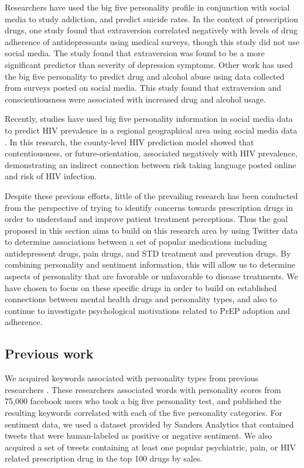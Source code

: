 Researchers have used the big five personality profile in conjunction with social media to study addiction\cite{andreassen2013relationships}, and predict suicide rates\cite{jashinsky2014tracking}. In the context of prescription drugs, one study found that extraversion correlated negatively with levels of drug adherence of antidepressants using medical surveys\cite{cohen20045}, though this study did not use social media. The study found that extraversion was found to be a more significant predictor than severity of depression symptoms. Other work has used the big five personality to predict drug and alcohol abuse\cite{livingston2015role} using data collected from surveys posted on social media. This study found that extraversion and conscientiousness were associated with increased drug and alcohol usage.

Recently, studies have used big five personality information in social media data to predict HIV prevalence in a regional geographical area using social media data \cite{ireland2015future}. In this research, the county-level HIV prediction model showed that contentiousness, or future-orientation, associated negatively with HIV prevalence, demonstrating an indirect connection between risk taking language posted online and risk of HIV infection.

Despite these previous efforts, little of the prevailing research has been conducted from the perspective of trying to identify concerns towards prescription drugs in order to understand and improve patient treatment perceptions. Thus the goal proposed in this section aims to build on this research area by using Twitter data to determine associations between a set of popular medications including antidepressent drugs, pain drugs, and STD treatment and prevention drugs. By combining personality and sentiment information, this will allow us to determine aspects of personality that are favorable or unfavorable to disease treatments. We have chosen to focus on these specific drugs in order to build on established connections between mental health drugs and personality types, and also to continue to investigate psychological motivations related to PrEP adoption and adherence.

\subsection{Previous work}

We acquired keywords associated with personality types from previous researchers \cite{schwartz2013toward}. These researchers associated words with personality scores from 75,000 facebook users who took a big five personality test, and published the resulting keywords correlated with each of the five personality categories. For sentiment data, we used a dataset provided by Sanders Analytics that contained tweets that were human-labeled as positive or negative sentiment. We also acquired a set of tweets containing at least one popular psychiatric, pain, or HIV related prescription drug in the top 100 drugs by sales.


